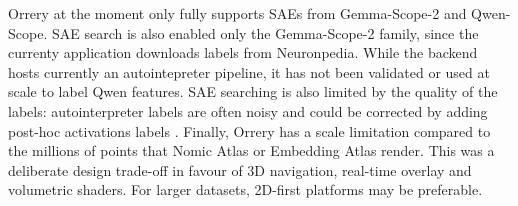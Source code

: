 \documentclass[11pt]{article}
\begin{document}
Orrery at the moment only fully supports SAEs from Gemma-Scope-2 and Qwen-Scope. SAE search is also enabled only the Gemma-Scope-2 family, since the currenty application downloads labels from Neuronpedia. While the backend hosts currently an autointepreter pipeline, it has not been validated or used at scale to label Qwen features. SAE searching is also limited by the quality of the labels: autointerpreter labels are often noisy \cite{jiang2025interpretableembeddingssparseautoencoders} and could be corrected by adding post-hoc activations labels \cite{arad-etal-2025-saes}. Finally, Orrery has a scale limitation compared to the millions of points that Nomic Atlas or Embedding Atlas render. This was a deliberate design trade-off in favour of 3D navigation, real-time overlay and volumetric shaders. For larger datasets, 2D-first platforms may be preferable. 








\end{document}
